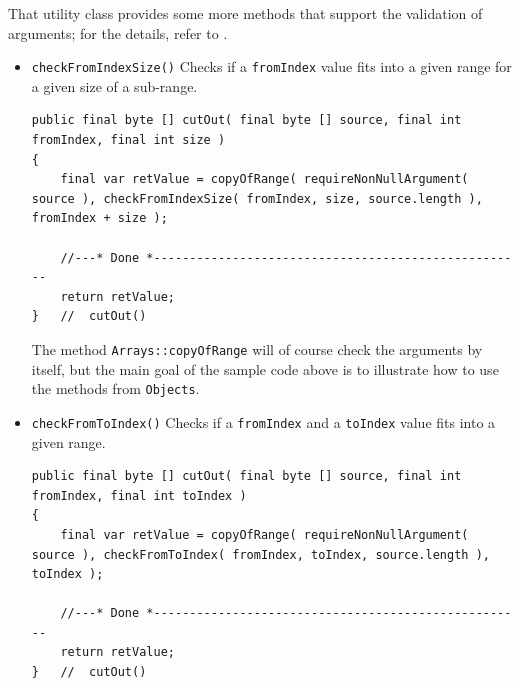 \documentclass[11pt,a4paper, titlepage, parskip=half, headsepline, footsepline, cleardoublepage=current, headheight=1cm]{scrbook}
\begin{document}
That utility class provides some more methods that support the validation of arguments; for the details, refer to \autocite{TQUADRAT_ORG_FOUNDATION_OBJECTS}.

\begin{itemize}
\item{\lstinline|checkFromIndexSize()|\autocite{TQUADRAT_ORG_FOUNDATION_OBJECTS:checkFromIndexSize} Checks if a \lstinline|fromIndex| value fits into a given range for a given size of a sub-range.

\begin{lstlisting}
public final byte [] cutOut( final byte [] source, final int fromIndex, final int size )
{
    final var retValue = copyOfRange( requireNonNullArgument( source ), checkFromIndexSize( fromIndex, size, source.length ), fromIndex + size );
	 
    //---* Done *----------------------------------------------------
    return retValue;
}   //  cutOut()
\end{lstlisting}

The method \lstinline|Arrays::copyOfRange|\autocite{ORACLE_DOC_ARRAYS:copyOfRange} will of course check the arguments by itself, but the main goal of the sample code above is to illustrate how to use the methods from \lstinline|Objects|.}

\item{\lstinline|checkFromToIndex()|\autocite{TQUADRAT_ORG_FOUNDATION_OBJECTS:checkFromToIndex} Checks if a \lstinline|fromIndex| and a \lstinline|toIndex| value fits into a given range.
\begin{lstlisting}
public final byte [] cutOut( final byte [] source, final int fromIndex, final int toIndex )
{
    final var retValue = copyOfRange( requireNonNullArgument( source ), checkFromToIndex( fromIndex, toIndex, source.length ), toIndex );
	 
    //---* Done *----------------------------------------------------
    return retValue;
}   //  cutOut()
\end{lstlisting}}


\end{itemize}
\end{document}
